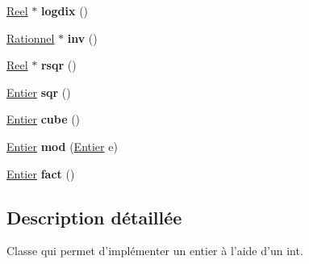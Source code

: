 \begin{DoxyCompactItemize}
\item 
\hypertarget{class_calcul_1_1_entier_abb6f1302f54d77b5fd600b05ab08d63b}{\hyperlink{class_calcul_1_1_reel}{Reel} $\ast$ {\bfseries logdix} ()}\label{class_calcul_1_1_entier_abb6f1302f54d77b5fd600b05ab08d63b}

\item 
\hypertarget{class_calcul_1_1_entier_af2df8f6d65821e5fecbf21066a35f824}{\hyperlink{class_calcul_1_1_rationnel}{Rationnel} $\ast$ {\bfseries inv} ()}\label{class_calcul_1_1_entier_af2df8f6d65821e5fecbf21066a35f824}

\item 
\hypertarget{class_calcul_1_1_entier_a9fdd393b537a785e8345dee128cdbf75}{\hyperlink{class_calcul_1_1_reel}{Reel} $\ast$ {\bfseries rsqr} ()}\label{class_calcul_1_1_entier_a9fdd393b537a785e8345dee128cdbf75}

\item 
\hypertarget{class_calcul_1_1_entier_accf5c68078b59f2ef3490195042d5b24}{\hyperlink{class_calcul_1_1_entier}{Entier} {\bfseries sqr} ()}\label{class_calcul_1_1_entier_accf5c68078b59f2ef3490195042d5b24}

\item 
\hypertarget{class_calcul_1_1_entier_a83c2833fe6841dcaa0c10beea1750a67}{\hyperlink{class_calcul_1_1_entier}{Entier} {\bfseries cube} ()}\label{class_calcul_1_1_entier_a83c2833fe6841dcaa0c10beea1750a67}

\item 
\hypertarget{class_calcul_1_1_entier_a16bb18c00fcb6a4c554c3eac3ff0939d}{\hyperlink{class_calcul_1_1_entier}{Entier} {\bfseries mod} (\hyperlink{class_calcul_1_1_entier}{Entier} e)}\label{class_calcul_1_1_entier_a16bb18c00fcb6a4c554c3eac3ff0939d}

\item 
\hypertarget{class_calcul_1_1_entier_a15488e68a0c47b0fa36baa2b3553bce9}{\hyperlink{class_calcul_1_1_entier}{Entier} {\bfseries fact} ()}\label{class_calcul_1_1_entier_a15488e68a0c47b0fa36baa2b3553bce9}

\end{DoxyCompactItemize}


\subsection{Description détaillée}
Classe qui permet d'implémenter un entier à l'aide d'un int. 

